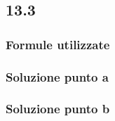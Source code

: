 \documentclass[../../main.tex]{subfiles}
\begin{document}
\subsection*{13.3}
\subsubsection*{Formule utilizzate}
\subsubsection*{Soluzione punto a}
\subsubsection*{Soluzione punto b}
\newpage
\end{document}
